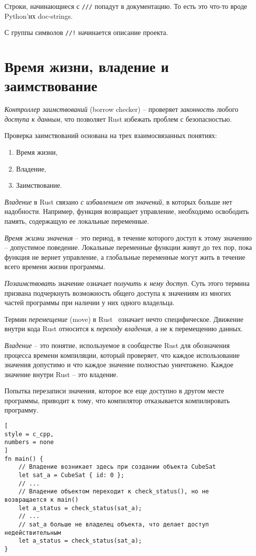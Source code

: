 \documentclass[%
	11pt,
	a4paper,
	utf8,
		]{article}
\begin{document}
Строки, начинающиеся с \verb|///| попадут в документацию. То есть это что-то вроде Python'их doc-strings.

С группы символов \verb|//!| начинается описание проекта.

\section{Время жизни, владение и заимствование}

\emph{Контроллер заимствований} (borrow checker) -- проверяет \emph{законность} любого \emph{доступа к данным}, что позволяет Rust избежать проблем с безопасностью.

Проверка заимствований основана на трех взаимосвязанных понятиях:
\begin{enumerate}
	\item Время жизни,
	
	\item Владение,
	
	\item Заимствование.
\end{enumerate}

\emph{Владение} в Rust связано \emph{с избавлением от значений}, в которых больше нет надобности. Например, функция возвращает управление, необходимо освободить память, содержащую ее локальные переменные.

\emph{Время жизни значения} -- это период, в течение которого доступ к этому значению -- допустимое поведение. Локальные переменные функции живут до тех пор, пока функция не вернет управление, а глобальные переменные могут жить в течение всего времени жизни программы.

\emph{Позаимствовать} значение означает \emph{получить к нему доступ}. Суть этого термина призвана подчеркнуть возможность общего доступа к значениям из многих частей программы при наличии у них одного владельца.

Термин \emph{перемещение} (move) в Rust  означает нечто специфическое. Движение внутри кода Rust относится к \emph{переходу владения}, а не к перемещению данных. 

\emph{Владение} -- это понятие, используемое в сообществе Rust для обозначения процесса времени компиляции, который проверяет, что каждое использование значения допустимо и что каждое значение полностью уничтожено. Каждое значение внутри Rust -- это владение.

Попытка перезаписи значения, которое все еще доступно в другом месте программы, приводит к тому, что компилятор отказывается компилировать программу.
\begin{lstlisting}[
style = c_cpp,
numbers = none
]
fn main() {
	// Владение возникает здесь при создании объекта CubeSat
    let sat_a = CubeSat { id: 0 };
    // ...
    // Владение объектом переходит к check_status(), но не возвращается к main()
    let a_status = check_status(sat_a);
    // ...
    // sat_a больше не владелец объекта, что делает доступ недействительным
    let a_status = check_status(sat_a);
}
\end{lstlisting}
\end{document}
